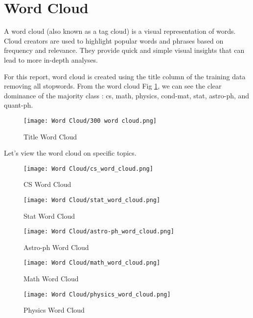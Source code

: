 \section{Word Cloud}
A word cloud (also known as a tag cloud) is a visual representation of words. Cloud creators are used to highlight popular words and phrases based on frequency and relevance. They provide quick and simple visual insights that can lead to more in-depth analyses.

For this report, word cloud is created using the title column of the training data removing all stopwords. From the word cloud Fig \ref{fig:Title Corpus Word Cloud}, we can see the clear dominance of the majority class : cs, math, physics, cond-mat, stat, astro-ph, and quant-ph.

\begin{figure}[H]
    \centering
    \texttt{[image: Word Cloud/300 word cloud.png]}
    \caption{Title Word Cloud}
    \label{fig:Title Corpus Word Cloud}
\end{figure}

Let's view the word cloud on specific topics. 

\begin{figure}[H]
    \centering
    \texttt{[image: Word Cloud/cs\_word\_cloud.png]}
    \caption{CS Word Cloud}
    \label{fig:cs Corpus Word Cloud}
\end{figure}

\begin{figure}[H]
    \centering
    \texttt{[image: Word Cloud/stat\_word\_cloud.png]}
    \caption{Stat Word Cloud}
    \label{fig:stat Corpus Word Cloud}
\end{figure}

\begin{figure}[H]
    \centering
    \texttt{[image: Word Cloud/astro-ph\_word\_cloud.png]}
    \caption{Astro-ph Word Cloud}
    \label{fig:astro-ph Corpus Word Cloud}
\end{figure}


\begin{figure}[H]
    \centering
    \texttt{[image: Word Cloud/math\_word\_cloud.png]}
    \caption{Math Word Cloud}
    \label{fig:math Corpus Word Cloud}
\end{figure}

\begin{figure}[H]
    \centering
    \texttt{[image: Word Cloud/physics\_word\_cloud.png]}
    \caption{Physics Word Cloud}
    \label{fig:physics Corpus Word Cloud}
\end{figure}

